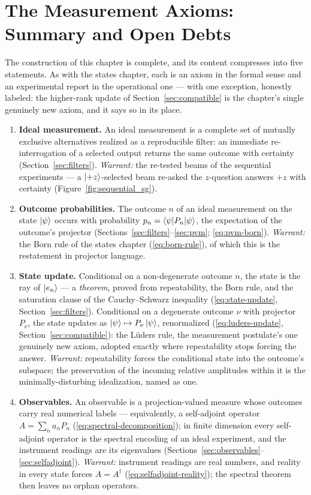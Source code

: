 \section{The Measurement Axioms: Summary and Open Debts}
\label{sec:ch3summary}

The construction of this chapter is complete, and its content compresses into five statements. As with the states chapter, each is an axiom in the formal sense and an experimental report in the operational one --- with one exception, honestly labeled: the higher-rank update of Section~\ref{sec:compatible} is the chapter's single genuinely new axiom, and it says so in its place.
\begin{enumerate}
    \item[\textbf{(M1)}] \textbf{Ideal measurement.} An ideal measurement is a complete set of mutually exclusive alternatives realized as a reproducible filter: an immediate re-interrogation of a selected output returns the same outcome with certainty (Section~\ref{sec:filters}). \emph{Warrant:} the re-tested beams of the sequential experiments --- a $\ket{+z}$-selected beam re-asked the $z$-question answers $+z$ with certainty (Figure~\ref{fig:sequential_sg}).
    \item[\textbf{(M2)}] \textbf{Outcome probabilities.} The outcome $n$ of an ideal measurement on the state $\ket{\psi}$ occurs with probability $p_n = \braket{\psi|P_n|\psi}$, the expectation of the outcome's projector (Sections~\ref{sec:filters}--\ref{sec:pvm}; \eqref{eq:pvm-born}). \emph{Warrant:} the Born rule of the states chapter (\eqref{eq:born-rule}), of which this is the restatement in projector language.
    \item[\textbf{(M3)}] \textbf{State update.} Conditional on a non-degenerate outcome $n$, the state is the ray of $\ket{e_n}$ --- a \emph{theorem}, proved from repeatability, the Born rule, and the saturation clause of the Cauchy--Schwarz inequality (\eqref{eq:state-update}, Section~\ref{sec:filters}). Conditional on a degenerate outcome $\nu$ with projector $P_\nu$, the state updates as $\ket{\psi} \mapsto P_\nu\ket{\psi}$, renormalized (\eqref{eq:luders-update}, Section~\ref{sec:compatible}): the L\"uders rule, the measurement postulate's one genuinely new axiom, adopted exactly where repeatability stops forcing the answer. \emph{Warrant:} repeatability forces the conditional state into the outcome's subspace; the preservation of the incoming relative amplitudes within it is the minimally-disturbing idealization, named as one.
    \item[\textbf{(M4)}] \textbf{Observables.} An observable is a projection-valued measure whose outcomes carry real numerical labels --- equivalently, a self-adjoint operator $A = \sum_n a_n P_n$ (\eqref{eq:spectral-decomposition}); in finite dimension every self-adjoint operator is the spectral encoding of an ideal experiment, and the instrument readings are its eigenvalues (Sections~\ref{sec:observables}--\ref{sec:selfadjoint}). \emph{Warrant:} instrument readings are real numbers, and reality in every state forces $A = A^\dagger$ (\eqref{eq:selfadjoint-reality}); the spectral theorem then leaves no orphan operators.

\end{enumerate}
